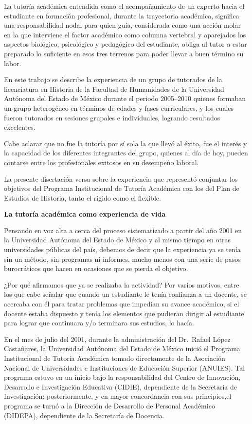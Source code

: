\bigskip
La tutoría académica entendida como el acompañamiento de un experto hacia el
estudiante en formación profesional, durante la trayectoria académica,
significa una responsabilidad nodal para quien guía, considerada como una
acción molar en la que interviene el factor académico como columna
vertebral y aparejados los aspectos biológico, psicológico y pedagógico del
estudiante, obliga al tutor a estar preparado lo suficiente en esos tres
terrenos para poder llevar a buen término su labor.


En este trabajo se describe la experiencia de un grupo de tutorados de la
licenciatura en Historia de la Facultad de Humanidades de la Universidad
Autónoma del Estado de México durante el periodo 2005--2010 quienes formaban
un grupo heterogéneo en términos de edades y fases curriculares, y los
cuales fueron tutorados en sesiones grupales e individuales, logrando
resultados excelentes.


Cabe aclarar que no fue la tutoría por sí sola la que llevó al éxito, fue el
interés y la capacidad de los diferentes integrantes del grupo, quienes al
día de hoy, pueden contarse entre los profesionales exitosos en su
desempeño laboral.


La presente disertación versa sobre la experiencia que representó conjuntar 
los objetivos del Programa Institucional de Tutoría Académica con los del Plan de 
Estudios de Historia, tanto el rígido como el flexible.


\bigskip
{\bfseries La tutoría académica como experiencia de vida}

\medskip
Pensando en voz alta a cerca del proceso sistematizado a partir del año 2001
en la Universidad Autónoma del Estado de México y al mismo tiempo en otras
universidades públicas del país, debemos de decir que la experiencia ya se
tenía sin un método, sin programas ni informes, mucho menos con una serie
de pasos burocráticos que hacen en ocasiones que se pierda el objetivo.


¿Por qué afirmamos que ya se realizaba la actividad? Por varios motivos,
entre los que cabe señalar que cuando un estudiante le tenía confianza a un
docente, se acercaba con él para tratar problemas que impedían su avance
académico, si el docente estaba dispuesto y tenía los elementos que
pudieran dirigir al estudiante para lograr que continuara y\slash{}o 
terminara sus estudios, lo hacía.


En el mes de julio del 2001, durante la administración del Dr.~Rafael\linebreak
López Castañares, la Universidad Autónoma del Estado de México inició el
Programa Institucional de Tutoría Académica tomado directamente de la
Asociación Nacional de Universidades e Instituciones de Educación Superior
(ANUIES). Tal programa estuvo en un inicio bajo la responsabilidad del
Centro de Innovación, Desarrollo e Investigación Educativa (CIDIE),
dependiente de la Secretaría de Investigación; posteriormente, y en mayor
concordancia con sus principios,\linebreak el programa se turnó a la Dirección de
Desarrollo de Personal Académico (DIDEPA), dependiente de la Secretaría de
Docencia.


